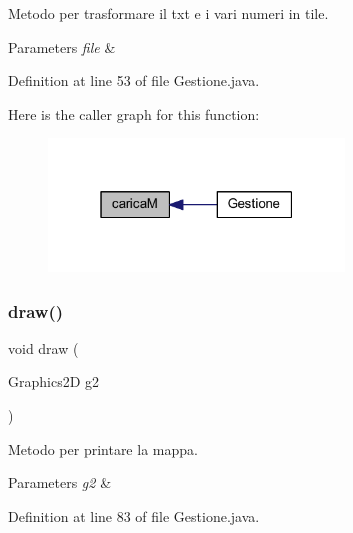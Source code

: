 Metodo per trasformare il txt e i vari numeri in tile. 


\begin{DoxyParams}{Parameters}
{\em file} & \\
\hline
\end{DoxyParams}


Definition at line 53 of file Gestione.\+java.

Here is the caller graph for this function\+:
\nopagebreak
\begin{figure}[H]
\begin{center}
\leavevmode
\includegraphics[width=223pt]{classblocchi_1_1_gestione_a373d83d9b42d31e72ccc982a3fd85ea9_icgraph}
\end{center}
\end{figure}
\mbox{\label{classblocchi_1_1_gestione_ae8c972c0fb4fcbc09c2219dd32cbd053}} 
\subsubsection{\texorpdfstring{draw()}{draw()}}
{\footnotesize\ttfamily void draw (\begin{DoxyParamCaption}\item[{Graphics2D}]{g2 }\end{DoxyParamCaption})}



Metodo per printare la mappa. 


\begin{DoxyParams}{Parameters}
{\em g2} & \\
\hline
\end{DoxyParams}


Definition at line 83 of file Gestione.\+java.

